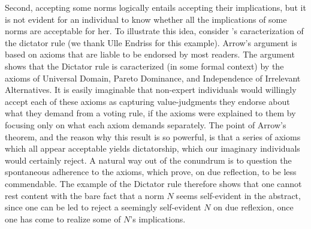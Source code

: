\documentclass[preprint, french, english, 11pt, authoryear]{elsarticle}%
\begin{document}
Second, accepting some norms logically entails accepting their implications, but it is not evident for an individual to know whether all the implications of some norms are acceptable for her. To illustrate this idea, consider \citeauthor{arrow_social_2012}’s \citeyearpar{arrow_social_2012} caracterization of the dictator rule (we thank Ulle Endriss for this example). Arrow's argument is based on axioms that are liable to be endorsed by most readers. The argument shows that the Dictator rule is caracterized (in some formal context) by the axioms of Universal Domain, Pareto Dominance, and Independence of Irrelevant Alternatives. It is easily imaginable that non-expert individuals would willingly accept each of these axioms as capturing value-judgments they endorse about what they demand from a voting rule, if the axioms were explained to them by focusing only on what each axiom demands separately. The point of Arrow's theorem, and the reason why this result is so powerful, is that a series of axioms which all appear acceptable yields dictatorship, which our imaginary individuals would certainly reject. A natural way out of the conundrum is to question the spontaneous adherence to the axioms, which prove, on due reflection, to be less commendable. The example of the Dictator rule therefore shows that one cannot rest content with the bare fact that a norm $N$ seems self-evident in the abstract, since one can be led to reject a seemingly self-evident $N$ on due reflexion, once one has come to realize some of $N$'s implications.
\end{document}

